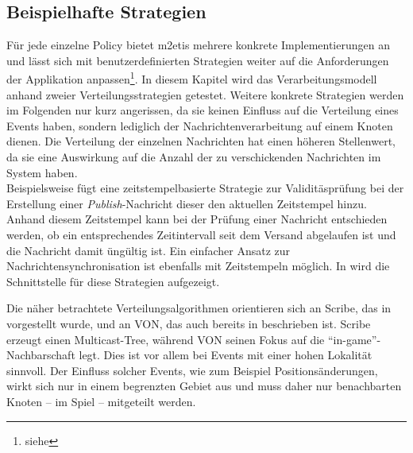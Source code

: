 \subsection*{Beispielhafte Strategien}
Für jede einzelne Policy bietet \ac{m2etis} mehrere konkrete Implementierungen an und lässt sich mit benutzerdefinierten Strategien weiter auf die Anforderungen der Applikation anpassen\footnote{siehe }. In diesem Kapitel wird das Verarbeitungsmodell anhand zweier Verteilungsstrategien getestet. Weitere konkrete Strategien werden im Folgenden nur kurz angerissen, da sie keinen Einfluss auf die Verteilung eines Events haben, sondern lediglich der Nachrichtenverarbeitung auf einem Knoten dienen. Die Verteilung der einzelnen Nachrichten hat einen höheren Stellenwert, da sie eine Auswirkung auf die Anzahl der zu verschickenden Nachrichten im System haben.\\
Beispielsweise fügt eine zeitstempelbasierte Strategie zur Validitäsprüfung bei der Erstellung einer \emph{Publish}-Nachricht dieser den aktuellen Zeitstempel hinzu. Anhand diesem Zeitstempel kann bei der Prüfung einer Nachricht entschieden werden, ob ein entsprechendes Zeitintervall seit dem Versand abgelaufen ist und die Nachricht damit üngültig ist. Ein einfacher Ansatz zur Nachrichtensynchronisation ist ebenfalls mit Zeitstempeln möglich. In  wird die Schnittstelle für diese Strategien aufgezeigt.

Die näher betrachtete Verteilungsalgorithmen orientieren sich an Scribe, das in  vorgestellt wurde, und an VON, das auch bereits in  beschrieben ist. Scribe erzeugt einen Multicast-Tree, während VON seinen Fokus auf die \enquote{in-game}-Nachbarschaft legt. Dies ist vor allem bei Events mit einer hohen Lokalität sinnvoll. Der Einfluss solcher Events, wie zum Beispiel Positionsänderungen, wirkt sich nur in einem begrenzten Gebiet aus und muss daher nur benachbarten Knoten -- im Spiel -- mitgeteilt werden.

